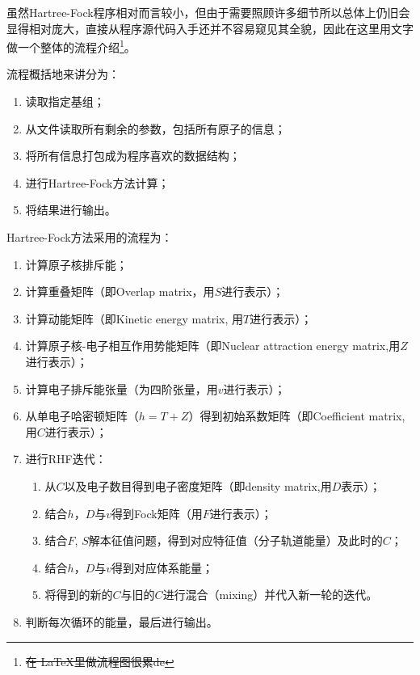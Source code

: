\documentclass[12pt,a4paper,openany,twoside]{article}
\numberwithin{equation}{section}
\begin{document}
            虽然Hartree-Fock程序相对而言较小，但由于需要照顾许多细节所以总体上仍旧会显得相对庞大，直接从程序源代码入手还并不容易窥见其全貌，因此在这里用文字做一个整体的流程介绍\footnote{\sout{在 \LaTeX 里做流程图很累de}}。

            流程概括地来讲分为：
            \begin{enumerate}
                \item 读取指定基组；
                \item 从文件读取所有剩余的参数，包括所有原子的信息；
                \item 将所有信息打包成为程序喜欢的数据结构；
                \item 进行Hartree-Fock方法计算；
                \item 将结果进行输出。
            \end{enumerate}

            Hartree-Fock方法采用的流程为：
            \begin{enumerate}
                \item 计算原子核排斥能；
                \item 计算重叠矩阵（即Overlap matrix，用$S$进行表示）；
                \item 计算动能矩阵（即Kinetic energy matrix, 用$T$进行表示）；
                \item 计算原子核-电子相互作用势能矩阵（即Nuclear attraction energy matrix,用$Z$进行表示）；
                \item 计算电子排斥能张量（为四阶张量，用$v$进行表示）；
                \item 从单电子哈密顿矩阵（$h = T+Z$）得到初始系数矩阵（即Coefficient matrix, 用$C$进行表示）；
                \item 进行RHF迭代：
                    \begin{enumerate}
                        \item 从$C$以及电子数目得到电子密度矩阵（即density matrix,用$D$表示）；
                        \item 结合$h$，$D$与$v$得到Fock矩阵（用$F$进行表示）；
                        \item 结合$F$, $S$解本征值问题，得到对应特征值（分子轨道能量）及此时的$C$；
                        \item 结合$h$，$D$与$v$得到对应体系能量；
                        \item 将得到的新的$C$与旧的$C$进行混合（mixing）并代入新一轮的迭代。
                    \end{enumerate}
                \item 判断每次循环的能量，最后进行输出。
            \end{enumerate}
\end{document}
